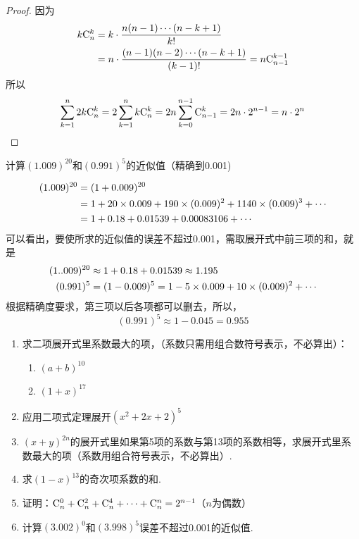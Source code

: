 \begin{proof}
因为
\[\begin{split}
    k{\rm C}^{k}_{n}&=k\cdot \dfrac{n(n-1)\cdots (n-k+1)}{k!}\\
    &=n\cdot \dfrac{(n-1)(n-2)\cdots (n-k+1)}{(k-1)!}=n{\rm C}^{k-1}_{n-1}
\end{split}\]
所以
\[\sum^n_{k=1}2k{\rm C}^{k}_{n}=2\sum^n_{k=1}k{\rm C}^{k}_{n}=2n\sum^{n-1}_{k=0}{\rm C}^{k}_{n-1}=2n\cdot 2^{n-1}=n\cdot 2^n\]
\end{proof}


\begin{example}
    计算$(1.009)^{20}$和$(0.991)^{5}$的近似值（精确到0.001)
\end{example}

\begin{solution}
\[\begin{split}
    (1.009)^{20}&=(1+0.009)^{20}\\
&=1+20\times0.009+190\times(0.009)^2+1140\times(0.009)^3+\cdots\\
&=1+0.18+0.01539+0.00083106+\cdots
\end{split}\]
可以看出，要使所求的近似值的误差不超过0.001，需取展开式中前三项的和，就是
\[\begin{split}
(1..009)^{20}&\approx 1+0.18+0.01539\approx 1.195\\
(0.991)^5&=(1-0.009)^5=1-5\times0.009+10\times(0.009)^2+\cdots    
\end{split}\]
根据精确度要求，第三项以后各项都可以删去，所以，
\[(0.991)^5\approx 1-0.045=0.955\]
\end{solution}

\begin{ex}
\begin{enumerate}
    \item 求二项展开式里系数最大的项，（系数只需用组合数符号表示，不必算出）：
\begin{multicols}{2}
\begin{enumerate}[(1)]
    \item $(a+b)^{10}$
    \item $(1+x)^{17}$
\end{enumerate}
\end{multicols}
    \item  应用二项式定理展开$(x^2+2x+2)^5$
    \item  $(x+y)^{2n}$的展开式里如果第5项的系数与第13项的系数相等，求展开式里系数最大的项（系数用组合符号表示，不必算出）.
    \item  求$(1-x)^{13}$的奇次项系数的和.
    \item 证明：${\rm C}^{0}_{n}+{\rm C}^{2}_{n}+{\rm C}^{4}_{n}+\cdots+{\rm C}^{n}_{n}=2^{n-1}$（$n$为偶数）
    \item 计算$(3.002)^0$和$(3.998)^5$误差不超过0.001的近似值.
\end{enumerate}
\end{ex}

